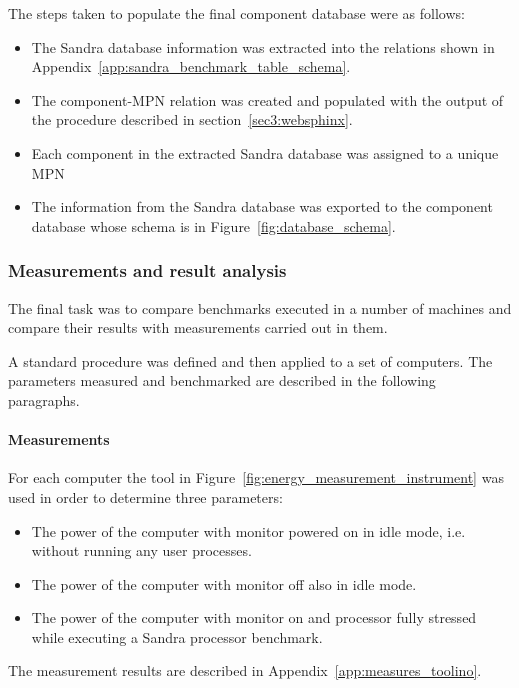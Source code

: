         The steps taken to populate the final component database were as follows:
        \begin{itemize}
            \item The Sandra database information was extracted into the relations shown in Appendix~\ref{app:sandra_benchmark_table_schema}.
            \item The component-MPN relation was created and populated with the output of the procedure described in section~\ref{sec3:websphinx}.
            \item Each component in the extracted Sandra database was assigned to a unique MPN
            \item The information from the Sandra database was exported to the component database whose schema is in Figure~\ref{fig:database_schema}.
        \end{itemize}
    
    \subsubsection*{Measurements and result analysis}
        The final task was to compare benchmarks executed in a number of machines and compare their results with measurements carried out in them.
        
        A standard procedure was defined and then applied to a set of computers. The parameters measured and benchmarked are described in the following paragraphs.

        \paragraph*{Measurements}
            For each computer the tool in Figure~\ref{fig:energy_measurement_instrument} was used in order to determine three parameters:
            \begin{itemize}
                \item The power of the computer with monitor powered on in idle mode, i.e. without running any user processes.
                \item The power of the computer with monitor off also in idle mode.
                \item The power of the computer with monitor on and processor fully stressed while executing a Sandra processor benchmark.
            \end{itemize}
            
            The measurement results are described in Appendix~\ref{app:measures_toolino}.
            
